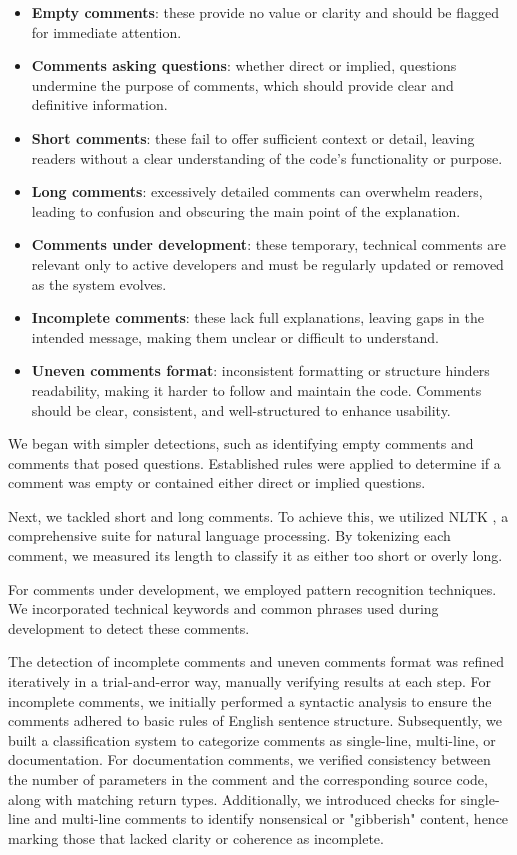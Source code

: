 \begin{itemize}
	\item \textbf{Empty comments}: these provide no value or clarity and should be flagged for immediate attention.
	\item \textbf{Comments asking questions}: whether direct or implied, questions undermine the purpose of comments, which should provide clear and definitive information.
	\item \textbf{Short comments}: these fail to offer sufficient context or detail, leaving readers without a clear understanding of the code’s functionality or purpose.
	\item \textbf{Long comments}: excessively detailed comments can overwhelm readers, leading to confusion and obscuring the main point of the explanation.
	\item \textbf{Comments under development}: these temporary, technical comments are relevant only to active developers and must be regularly updated or removed as the system evolves.
	\item \textbf{Incomplete comments}: these lack full explanations, leaving gaps in the intended message, making them unclear or difficult to understand.
	\item \textbf{Uneven comments format}: inconsistent formatting or structure hinders readability, making it harder to follow and maintain the code. Comments should be clear, consistent, and well-structured to enhance usability.
\end{itemize}

\noindent We began with simpler detections, such as identifying empty comments and comments that posed questions. Established rules were applied to determine if a comment was empty or contained either direct or implied questions.

\noindent Next, we tackled short and long comments. To achieve this, we utilized NLTK \cite{NLTK}, a comprehensive suite for natural language processing. By tokenizing each comment, we measured its length to classify it as either too short or overly long.

\noindent For comments under development, we employed pattern recognition techniques. We incorporated technical keywords and common phrases used during development to detect these comments.

\noindent The detection of incomplete comments and uneven comments format was refined iteratively in a trial-and-error way, manually verifying results at each step. For incomplete comments, we initially performed a syntactic analysis to ensure the comments adhered to basic rules of English sentence structure. Subsequently, we built a classification system to categorize comments as single-line, multi-line, or documentation. For documentation comments, we verified consistency between the number of parameters in the comment and the corresponding source code, along with matching return types. Additionally, we introduced checks for single-line and multi-line comments to identify nonsensical or "gibberish" content, hence marking those that lacked clarity or coherence as incomplete.


